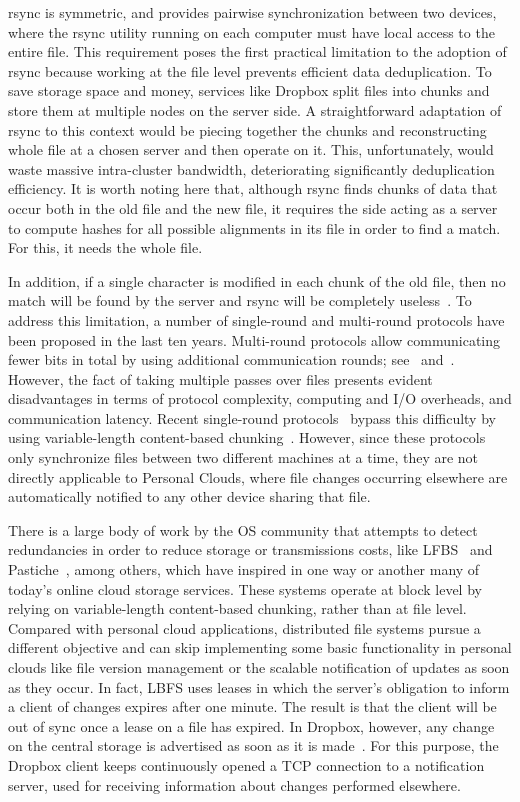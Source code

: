 rsync is symmetric, and provides pairwise synchronization between two devices, where the rsync
utility running on each computer must have local access to the entire file. This requirement
poses the first practical limitation to the adoption of rsync because working at the file level
prevents efficient data deduplication. To save storage space and money, services like Dropbox
split files into chunks and store them at multiple nodes on the server side. A straightforward
adaptation of rsync to this context would be piecing together the chunks and reconstructing
whole file at a chosen server and then operate on it. This, unfortunately, would waste massive
intra-cluster bandwidth, deteriorating significantly deduplication efficiency. It is worth
noting here that, although rsync finds chunks of data that occur both in the old file and the
new file, it requires the side acting as a server to compute hashes for all possible alignments
in its file in order to find a match. For this, it needs the whole file.  

In addition, if a single character is modified in each chunk of the old file, then no match
will be found by the server and rsync will be completely useless~\cite{langford01}. To address this limitation,
a number of single-round and multi-round protocols have been proposed in the last ten years. 
Multi-round protocols allow communicating fewer bits in total by using additional communication
rounds; see~\cite{langford01} and~\cite{suel04}. However, the fact of taking multiple passes over files presents evident
disadvantages in terms of protocol complexity, computing and I/O overheads, and communication
latency. Recent single-round protocols~\cite{irmak05}\cite{hao08} bypass this difficulty by using variable-length
content-based chunking~\cite{Muthitacharoen01}. However, since these protocols only synchronize files between two
different machines at a time, they are not directly applicable to Personal Clouds, where file
changes occurring elsewhere are automatically notified to any other device sharing that file. 

There is a large body of work by the OS community that attempts to detect redundancies in order
to reduce storage or transmissions costs, like LFBS~\cite{Muthitacharoen01} and Pastiche~\cite{Cox02}, among others, which
have inspired in one way or another many of today's online cloud storage services. These systems
operate at block level by relying on variable-length content-based chunking, rather than at
file level. Compared with personal cloud applications, distributed file systems pursue a
different objective and can skip implementing some basic functionality in personal clouds like
file version management or the scalable notification of updates as soon as they occur. In fact,
LBFS uses leases in which the server's obligation to inform a client of changes expires after one
minute. The result is that the client will be out of sync once a lease on a file has expired. 
In Dropbox, however, any change on the central storage is advertised as soon as it is made~\cite{drago2012inside}.
For this purpose, the Dropbox client keeps continuously opened a TCP connection to a notification
server, used for receiving information about changes performed elsewhere.

